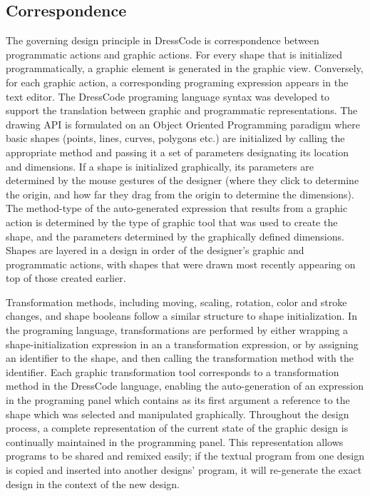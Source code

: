 \documentclass{sigchi}
\begin{document}
\subsection{Correspondence}
\label{subsec:correspondence}
The governing design principle in DressCode is correspondence between programmatic actions and graphic actions. For every shape that is initialized programmatically, a graphic element is generated in the graphic view. Conversely, for each graphic action, a corresponding programing expression appears in the text editor. The DressCode programing language syntax was developed to support the translation between graphic and programmatic representations. The drawing API is formulated on an Object Oriented Programming paradigm where basic shapes (points, lines, curves, polygons etc.) are initialized by calling the appropriate method and passing it a set of parameters designating its location and dimensions. If a shape is initialized graphically, its parameters are determined by the mouse gestures of the designer (where they click to determine the origin, and how far they drag from the origin to determine the dimensions). The method-type of the auto-generated expression that results from a graphic action is determined by the type of graphic tool that was used to create the shape, and the parameters determined by the graphically defined dimensions. Shapes are layered in a design in order of the designer's graphic and programmatic actions, with shapes that were drawn most recently appearing on top of those created earlier. %

Transformation methods, including moving, scaling, rotation, color and stroke changes, and shape booleans follow a similar structure to shape initialization. In the programing language, transformations are performed by either wrapping a shape-initialization expression in an a transformation expression, or by assigning an identifier to the shape, and then calling the transformation method with the identifier. Each graphic transformation tool corresponds to a transformation method in the DressCode language, enabling the auto-generation of an expression in the programing panel which contains as its first argument a reference to the shape which was selected and manipulated graphically. Throughout the design process, a complete representation of the current state of the graphic design is continually maintained in the programming panel. This representation allows programs to be shared and remixed easily; if the textual program from one design is copied and inserted into another designs' program, it will re-generate the exact design in the context of the new design. 
\end{document}
